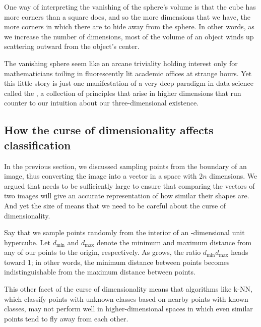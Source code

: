 One way of interpreting the vanishing of the sphere's volume is that the cube has more corners than a square does, and so the more dimensions that we have, the more corners in which there are to hide away from the sphere. In other words, as we increase the number of dimensions, most of the volume of an object winds up scattering outward from the object's center.

The vanishing sphere seem like an arcane triviality holding interest only for mathematicians toiling in fluorescently lit academic offices at strange hours. Yet this little story is just one manifestation of a very deep paradigm in data science called the , a collection of principles that arise in higher dimensions that run counter to our intuition about our three-dimensional existence.

\FloatBarrier
{}
\subsection{How the curse of dimensionality affects classification}

In the previous section, we discussed sampling  points from the boundary of an image, thus converting the image into a vector in a space with $2n$ dimensions. We argued that  needs to be sufficiently large to ensure that comparing the vectors of two images will give an accurate representation of how similar their shapes are. And yet the size of  means that we need to be careful about the curse of dimensionality.

Say that we sample  points randomly from the interior of an -dimensional unit hypercube. Let $d_{\text{min}}$ and $d_{\text{max}}$ denote the minimum and maximum distance from any of our points to the origin, respectively. As  grows, the ratio $d_{\text{min}}d_{\text{max}}$ heads toward 1; in other words, the minimum distance between points becomes indistinguishable from the maximum distance between points.

This other facet of the curse of dimensionality means that algorithms like k-NN, which classify points with unknown classes based on nearby points with known classes, may not perform well in higher-dimensional spaces in which even similar points tend to fly away from each other.

